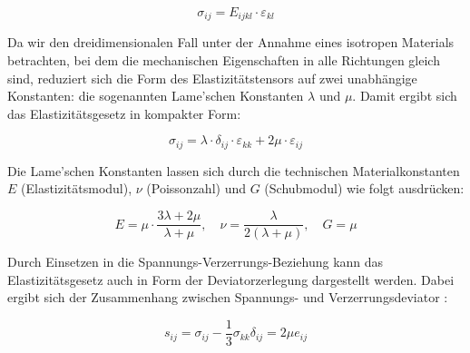 	\begin{equation}
		\sigma_{ij} = 
		E_{ijkl} \cdot \varepsilon_{kl}
	\end{equation}

Da wir den dreidimensionalen Fall unter der Annahme eines isotropen Materials betrachten, bei dem die mechanischen Eigenschaften in alle Richtungen gleich sind, reduziert sich die Form des Elastizitätstensors auf zwei unabhängige Konstanten: die sogenannten Lame’schen Konstanten $\lambda$ und $\mu$. 
Damit ergibt sich das Elastizitätsgesetz in kompakter Form:

	\begin{equation}
		\sigma_{ij} = 
		\lambda \cdot \delta_{ij} \cdot \varepsilon_{kk} + 2\mu \cdot \varepsilon_{ij}
	\end{equation}

Die Lame’schen Konstanten lassen sich durch die technischen Materialkonstanten $E$ (Elastizitätsmodul), $\nu$ (Poissonzahl) und $G$ (Schubmodul) wie folgt ausdrücken:

	\begin{equation}
		E = 
		\mu \cdot \frac{3\lambda + 2\mu}{\lambda + \mu}, \quad 
		\nu = 
		\frac{\lambda}{2(\lambda + \mu)}, \quad 
		G = 
		\mu
	\end{equation}

Durch Einsetzen in die Spannungs-Verzerrungs-Beziehung kann das Elastizitätsgesetz auch in Form der Deviatorzerlegung dargestellt werden. 
Dabei ergibt sich der Zusammenhang zwischen Spannungs- und Verzerrungsdeviator \cite{elastomechanik:Grundlagen der Elastizitaetstheorie}:

	\begin{equation}
		s_{ij} = 
		\sigma_{ij} - \frac{1}{3} \sigma_{kk} \delta_{ij} = 
		2\mu e_{ij}
	\end{equation}